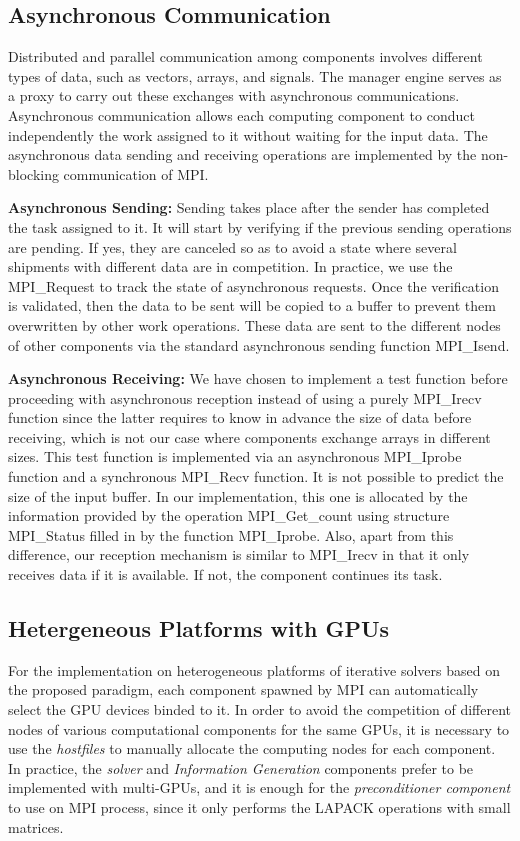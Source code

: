 \subsection{Asynchronous Communication}

Distributed and parallel communication among components involves different types of data, such as vectors, arrays, and signals. The manager engine serves as a proxy to carry out these exchanges with asynchronous communications. Asynchronous communication allows each computing component to conduct independently the work assigned to it without waiting for the input data. The asynchronous data sending and receiving operations are implemented by the non-blocking communication of MPI. 

\textbf{Asynchronous Sending:} Sending takes place after the sender has completed the task assigned to it. It will start by verifying if the previous sending operations are pending. If yes, they are canceled so as to avoid a state where several shipments with different data are in competition. In practice, we use the MPI\_Request to track the state of asynchronous requests. Once the verification is validated, then the data to be sent will be copied to a buffer to prevent them overwritten by other work operations. These data are sent to the different nodes of other components via the standard asynchronous sending function MPI\_Isend.

\textbf{Asynchronous Receiving:} We have chosen to implement a test function before proceeding with asynchronous reception instead of using a purely MPI\_Irecv function since the latter requires to know in advance the size of data before receiving, which is not our case where components exchange arrays in different sizes. This test function is implemented via an asynchronous MPI\_Iprobe function and a synchronous MPI\_Recv function. It is not possible to predict the size of the input buffer. In our implementation, this one is allocated by the information provided by the operation MPI\_Get\_count using structure MPI\_Status filled in by the function MPI\_Iprobe. Also, apart from this difference, our reception mechanism is similar to MPI\_Irecv in that it only receives data if it is available. If not, the component continues its task. 

\subsection{Hetergeneous Platforms with GPUs}

For the implementation on heterogeneous platforms of iterative solvers based on the proposed paradigm, each component spawned by MPI can automatically select the GPU devices binded to it. In order to avoid the competition of different nodes of various computational components for the same GPUs, it is necessary to use the \textit{hostfiles} to manually allocate the computing nodes for each component. In practice, the \textit{solver} and \textit{Information Generation} components prefer to be implemented with multi-GPUs, and it is enough for the \textit{preconditioner component} to use on MPI process, since it only performs the LAPACK operations with small matrices.


